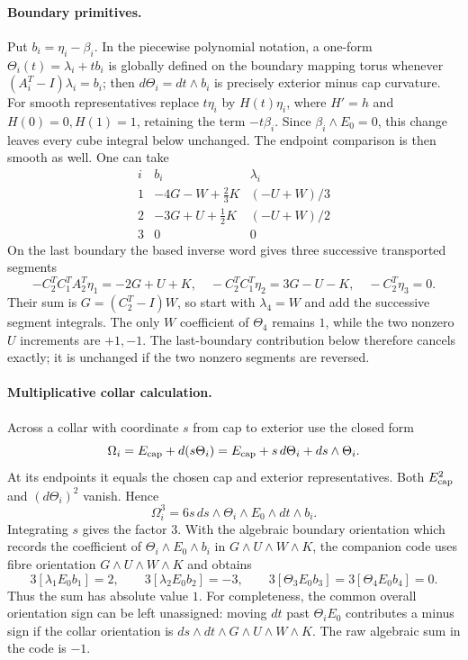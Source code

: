 \paragraph{Boundary primitives.}
Put $b_i=\eta_i-\beta_i$.  In the piecewise polynomial notation, a one-form
$\Theta_i(t)=\lambda_i+t b_i$ is globally defined on the boundary mapping
torus whenever $(A_i^T-I)\lambda_i=b_i$; then
$d\Theta_i=dt\wedge b_i$ is precisely exterior minus cap curvature.
For smooth representatives replace $t\eta_i$ by $H(t)\eta_i$,
where $H'=h$ and $H(0)=0,H(1)=1$, retaining the term $-t\beta_i$.
Since $\beta_i\wedge E_0=0$, this change leaves every cube integral below
unchanged. The endpoint comparison is then smooth as well. One can take
\[
\begin{array}{c|c|c}
i& b_i&\lambda_i\\\hline
1&-4G-W+\tfrac23K&(-U+W)/3\\
2&-3G+U+\tfrac12K&(-U+W)/2\\
3&0&0
\end{array}
\]
On the last boundary the based inverse word gives three successive
transported segments
\[
 -C_2^TC_1^TA_2^T\eta_1=-2G+U+K,\quad
 -C_2^TC_1^T\eta_2=3G-U-K,\quad
 -C_2^T\eta_3=0.
\]
Their sum is $G=(C_2^T-I)W$, so start with $\lambda_4=W$ and add the
successive segment integrals. The only $W$ coefficient of $\Theta_4$
remains $1$, while the two nonzero $U$ increments are $+1,-1$.
The last-boundary contribution below therefore cancels exactly;
it is unchanged if the two nonzero segments are reversed.

\paragraph{Multiplicative collar calculation.}
Across a collar with coordinate $s$ from cap to exterior use the closed
form
\[
 \Omega_i=E_{\rm cap}+d(s\Theta_i)
          =E_{\rm cap}+s\,d\Theta_i+ds\wedge\Theta_i.
\]
At its endpoints it equals the chosen cap and exterior representatives.
Both $E_{\rm cap}^2$ and $(d\Theta_i)^2$ vanish. Hence
\[
 \Omega_i^3=6s\,ds\wedge\Theta_i\wedge E_0\wedge dt\wedge b_i.
\]
Integrating $s$ gives the factor $3$. With the algebraic boundary
orientation which records the coefficient of
$\Theta_i\wedge E_0\wedge b_i$ in $G\wedge U\wedge W\wedge K$,
the companion code uses fibre orientation $G\wedge U\wedge W\wedge K$
and obtains
\[
 3[\lambda_1E_0b_1]=2,\qquad
 3[\lambda_2E_0b_2]=-3,\qquad
 3[\Theta_3E_0b_3]=3[\Theta_4E_0b_4]=0.
\]
Thus the sum has absolute value $1$. For completeness, the common
overall orientation sign can be left unassigned: moving $dt$ past $\Theta_iE_0$ contributes a minus sign if
the collar orientation is $ds\wedge dt\wedge G\wedge U\wedge W\wedge K$.
The raw algebraic sum in the code is $-1$.

